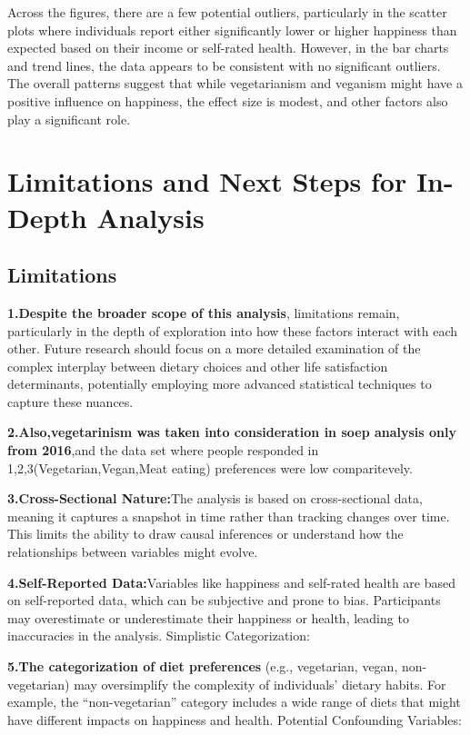 \documentclass[
]{article}
\begin{document}
Across the figures, there are a few potential outliers, particularly in
the scatter plots where individuals report either significantly lower or
higher happiness than expected based on their income or self-rated
health. However, in the bar charts and trend lines, the data appears to
be consistent with no significant outliers. The overall patterns suggest
that while vegetarianism and veganism might have a positive influence on
happiness, the effect size is modest, and other factors also play a
significant role.

\section{Limitations and Next Steps for In-Depth
Analysis}\label{limitations-and-next-steps-for-in-depth-analysis}

\subsection{Limitations}\label{limitations}

\textbf{1.Despite the broader scope of this analysis}, limitations
remain, particularly in the depth of exploration into how these factors
interact with each other. Future research should focus on a more
detailed examination of the complex interplay between dietary choices
and other life satisfaction determinants, potentially employing more
advanced statistical techniques to capture these nuances.

\textbf{2.Also,vegetarinism was taken into consideration in soep
analysis only from 2016},and the data set where people responded in
1,2,3(Vegetarian,Vegan,Meat eating) preferences were low comparitevely.

\textbf{3.Cross-Sectional Nature:}The analysis is based on
cross-sectional data, meaning it captures a snapshot in time rather than
tracking changes over time. This limits the ability to draw causal
inferences or understand how the relationships between variables might
evolve.

\textbf{4.Self-Reported Data:}Variables like happiness and self-rated
health are based on self-reported data, which can be subjective and
prone to bias. Participants may overestimate or underestimate their
happiness or health, leading to inaccuracies in the analysis. Simplistic
Categorization:

\textbf{5.The categorization of diet preferences} (e.g., vegetarian,
vegan, non-vegetarian) may oversimplify the complexity of individuals'
dietary habits. For example, the ``non-vegetarian'' category includes a
wide range of diets that might have different impacts on happiness and
health. Potential Confounding Variables:
\end{document}
